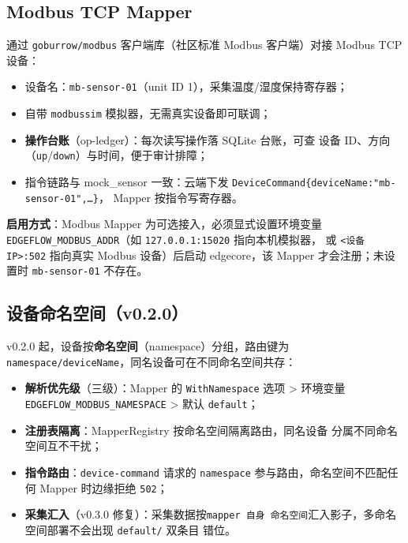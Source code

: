 \subsection{Modbus TCP Mapper}

通过 \texttt{goburrow/modbus} 客户端库（社区标准 Modbus 客户端）对接
Modbus TCP 设备：

\begin{itemize}
  \item 设备名：\texttt{mb-sensor-01}（unit ID 1），采集温度/湿度保持寄存器；
  \item 自带 \texttt{modbussim} 模拟器，无需真实设备即可联调；
  \item \textbf{操作台账}（op-ledger）：每次读写操作落 SQLite 台账，可查
        设备 ID、方向（\texttt{up}/\texttt{down}）与时间，便于审计排障；
  \item 指令链路与 mock\_sensor 一致：云端下发
        \texttt{DeviceCommand\{deviceName:"mb-sensor-01",\ldots\}}，
        Mapper 按指令写寄存器。
\end{itemize}

\textbf{启用方式}：Modbus Mapper 为可选接入，必须显式设置环境变量
\texttt{EDGEFLOW\_MODBUS\_ADDR}（如 \texttt{127.0.0.1:15020} 指向本机模拟器，
或 \texttt{<设备IP>:502} 指向真实 Modbus 设备）后启动 edgecore，该 Mapper
才会注册；未设置时 \texttt{mb-sensor-01} 不存在。

\subsection{设备命名空间（v0.2.0）}

v0.2.0 起，设备按\textbf{命名空间}（namespace）分组，路由键为
\texttt{namespace/deviceName}，同名设备可在不同命名空间共存：

\begin{itemize}
  \item \textbf{解析优先级}（三级）：Mapper 的 \texttt{WithNamespace} 选项 >
        环境变量 \texttt{EDGEFLOW\_MODBUS\_NAMESPACE} > 默认 \texttt{default}；
  \item \textbf{注册表隔离}：MapperRegistry 按命名空间隔离路由，同名设备
        分属不同命名空间互不干扰；
  \item \textbf{指令路由}：\texttt{device-command} 请求的 \texttt{namespace}
        参与路由，命名空间不匹配任何 Mapper 时边缘拒绝 \texttt{502}；
  \item \textbf{采集汇入}（v0.3.0 修复）：采集数据按\texttt{mapper 自身
        命名空间}汇入影子，多命名空间部署不会出现 \texttt{default/} 双条目
        错位。
\end{itemize}


